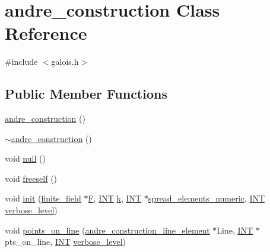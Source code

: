 \hypertarget{classandre__construction}{}\section{andre\+\_\+construction Class Reference}
\label{classandre__construction}


{\ttfamily \#include $<$galois.\+h$>$}

\subsection*{Public Member Functions}
\begin{DoxyCompactItemize}
\item 
\mbox{\hyperlink{classandre__construction_a3883b32d941c249408f1ae69ed72b30a}{andre\+\_\+construction}} ()
\item 
\mbox{\hyperlink{classandre__construction_a59e07cf0d8082dfdd689b028f5dedb4e}{$\sim$andre\+\_\+construction}} ()
\item 
void \mbox{\hyperlink{classandre__construction_a34ed31ea42d620add994069c7ecfa4d3}{null}} ()
\item 
void \mbox{\hyperlink{classandre__construction_a6ac48a241be1155e18af795e08169c57}{freeself}} ()
\item 
void \mbox{\hyperlink{classandre__construction_a8e763c87474e64d559a1dd2aa7971a4a}{init}} (\mbox{\hyperlink{classfinite__field}{finite\+\_\+field}} $\ast$\mbox{\hyperlink{classandre__construction_abb83384644c7629b70e6ea85a8f698c2}{F}}, \mbox{\hyperlink{galois_8h_a09fddde158a3a20bd2dcadb609de11dc}{I\+NT}} \mbox{\hyperlink{classandre__construction_a30e383b93e247758866cebd5827818dd}{k}}, \mbox{\hyperlink{galois_8h_a09fddde158a3a20bd2dcadb609de11dc}{I\+NT}} $\ast$\mbox{\hyperlink{classandre__construction_ad3bedb4030db5922d2fc4d4834c9758c}{spread\+\_\+elements\+\_\+numeric}}, \mbox{\hyperlink{galois_8h_a09fddde158a3a20bd2dcadb609de11dc}{I\+NT}} \mbox{\hyperlink{simeon_8_c_a818073fbcc2f439e7c56952f67386122}{verbose\+\_\+level}})
\item 
void \mbox{\hyperlink{classandre__construction_a3a19d0f857a4d012abdf421adbf57a73}{points\+\_\+on\+\_\+line}} (\mbox{\hyperlink{classandre__construction__line__element}{andre\+\_\+construction\+\_\+line\+\_\+element}} $\ast$Line, \mbox{\hyperlink{galois_8h_a09fddde158a3a20bd2dcadb609de11dc}{I\+NT}} $\ast$pts\+\_\+on\+\_\+line, \mbox{\hyperlink{galois_8h_a09fddde158a3a20bd2dcadb609de11dc}{I\+NT}} \mbox{\hyperlink{simeon_8_c_a818073fbcc2f439e7c56952f67386122}{verbose\+\_\+level}})
\end{DoxyCompactItemize}
